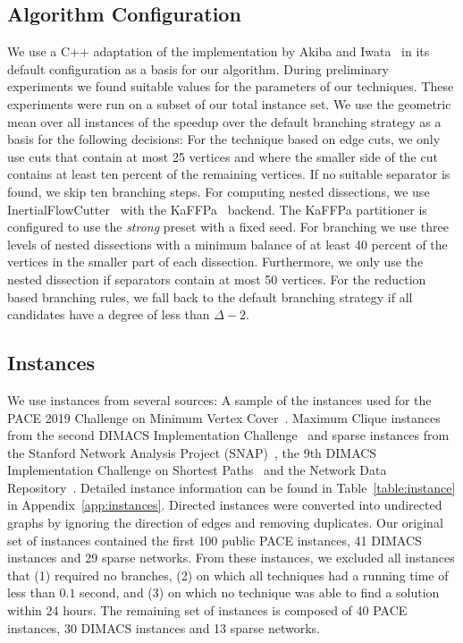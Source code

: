 \documentclass[a4paper,UKenglish,cleveref, autoref, thm-restate]{lipics-v2021}
\begin{document}
\subsection{Algorithm Configuration}
\label{sec:algo_conf}
We use a C++ adaptation of the implementation by Akiba and
Iwata~\cite{AkibaIwata} in its default configuration as a basis for our algorithm. During preliminary experiments we found
suitable values for the parameters of
our techniques. These experiments were run on a subset of our total instance
set. We use the geometric mean over all instances of the speedup over the
default branching strategy as a basis for the following decisions: For the technique based on
edge cuts, we only use cuts that contain at most 25 vertices and where the smaller side of
the cut contains at least ten percent of the remaining vertices. If no suitable separator is found, we skip ten branching steps. For computing nested dissections, we use 
InertialFlowCutter~\cite{gottesburen2019faster}
with the KaFFPa~\cite{DBLP:conf/wea/SandersS13}
backend. The KaFFPa partitioner is configured to use the \emph{strong} preset
with a fixed seed. For branching we use
three levels of nested dissections with a minimum balance of at least 40 percent of the vertices in the smaller part of each dissection. Furthermore, we
only use the nested dissection if separators contain at most
50 vertices. For the reduction based
branching rules, we fall back to the default branching strategy if all
candidates have a degree of less than $\Delta - 2$. 

\subsection{Instances}
We use instances from several sources: A sample of the instances used for the
PACE 2019 Challenge on Minimum Vertex Cover~\cite{dzulfikar_et_al:LIPIcs:2019:11486}. 
Maximum Clique instances from the second DIMACS Implementation Challenge~\cite{johnson1993cliques} and sparse instances from
the Stanford Network Analysis Project (SNAP)~\cite{snapnets}, the 9th DIMACS
Implementation Challenge on Shortest Paths~\cite{demetrescu2009shortest} and the
Network Data Repository~\cite{nr}. Detailed instance information can
be found in Table~\ref{table:instance} in Appendix~\ref{app:instances}. Directed instances were converted into
undirected graphs by ignoring the direction of edges and removing duplicates.
Our original set of instances contained the first 100 public PACE instances, 41 DIMACS instances and 29 sparse networks.
From these instances, we excluded all instances that (1) required no branches, (2) on which all techniques had a running time of less than $0.1$ second, and (3) on which no technique was able to find a solution within 24 hours.
The remaining set of instances is composed of 40 PACE instances, 30 DIMACS instances and 13 sparse networks.
\end{document}
